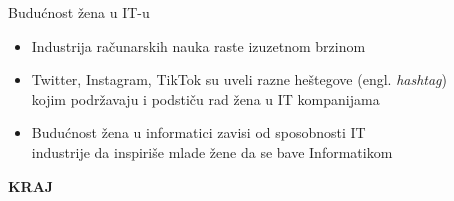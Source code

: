\documentclass[aspectratio=169]{beamer}
\begin{document}
{
\begin{frame}{Budućnost žena u IT-u} 
   
   \begin{itemize}
        \item<2-> Industrija računarskih nauka raste izuzetnom brzinom

        \item<3-> Twitter, Instagram, TikTok su uveli razne heštegove (engl. \textit{hashtag})\\ kojim podržavaju i podstiču rad žena u IT kompanijama  

        \item<4-> Budućnost žena u informatici zavisi od sposobnosti IT\\ industrije da inspiriše mlade žene da se bave Informatikom
   \end{itemize}
   
\end{frame}
}


{
\begin{frame}
    \centering
   \textbf{\Huge{KRAJ}} 
\end{frame}
}
\end{document}
